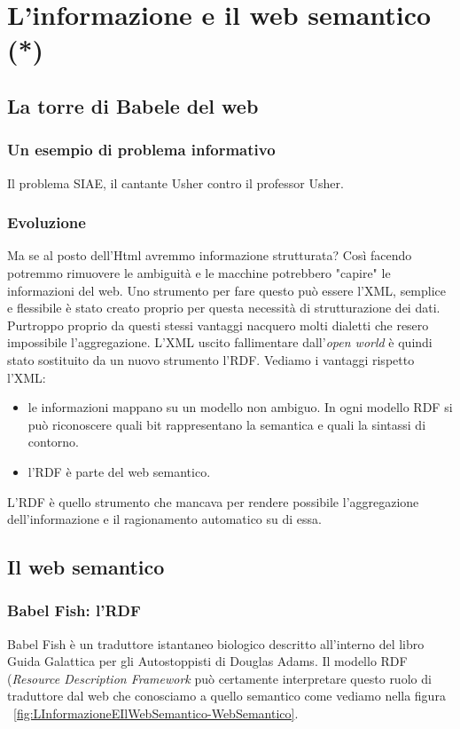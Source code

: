 
\chapter{L'informazione e il web semantico (*)}

	\section{La torre di Babele del web}
	
		\subsection{Un esempio di problema informativo}
			Il problema SIAE, il cantante Usher contro il professor Usher.
		
		\subsection{Evoluzione}
			Ma se al posto dell'Html avremmo informazione strutturata? Così facendo potremmo rimuovere le  ambiguità e le macchine potrebbero "capire" le informazioni del web. Uno strumento per fare questo può essere l'XML, semplice e flessibile è stato creato proprio per questa necessità di strutturazione dei dati. Purtroppo proprio da questi stessi vantaggi nacquero molti dialetti che resero impossibile l'aggregazione. L'XML uscito fallimentare dall'\emph{open world} è quindi stato sostituito da un nuovo strumento l'RDF. Vediamo i vantaggi rispetto l'XML:
			\begin{itemize}
				\item le informazioni mappano su un modello non ambiguo. In ogni modello RDF si può riconoscere quali bit rappresentano la semantica e quali la sintassi di contorno.
				\item l'RDF è parte del web semantico.
			\end{itemize}
			L'RDF è quello strumento che mancava per rendere possibile l'aggregazione dell'informazione e il ragionamento automatico su di essa.
		
	\section{Il web semantico}
	
		\subsection{Babel Fish: l'RDF}
			Babel Fish è un traduttore istantaneo biologico descritto all'interno del libro Guida Galattica per gli Autostoppisti di Douglas Adams. Il modello RDF (\emph{Resource Description Framework} può certamente interpretare questo ruolo di traduttore dal web che conosciamo a quello semantico come vediamo nella figura ~\ref{fig:LInformazioneEIlWebSemantico-WebSemantico}.
			

